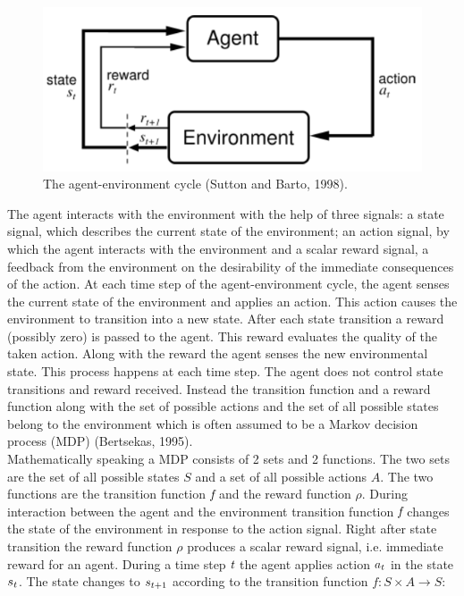 \begin{figure}[ht]
\vskip 0.2in
\centering
\includegraphics[scale=0.9]{agent-env-cycle.png}
\caption{The agent-environment cycle (Sutton and Barto, 1998).}
\vskip -0.2in
\label{fig:agent-env-cycle}
\end{figure}

The agent interacts with the environment with the help of three signals: a state signal, which describes the current state of the environment; an action signal, by which the agent interacts with the environment and a scalar reward signal, a feedback from the environment on the desirability of the immediate consequences of the action. At each time step of the agent-environment cycle, the agent senses the current state of the environment and applies an action. This action causes the environment to transition into a new state. After each state transition a reward (possibly zero) is passed to the agent. This reward evaluates the quality of the taken action. Along with the reward the agent senses the new environmental state. This process happens at each time step. The agent does not control state transitions and reward received. Instead the transition function and a reward function along with the set of possible actions and the set of all possible states belong to the environment which is often assumed to be a Markov decision process (MDP) (Bertsekas, 1995\nocite{bertsekas1995dynamic}). \\

Mathematically speaking a MDP consists of 2 sets and 2 functions. The two sets are the set of all possible states $\textit{S}$ and a set of all possible actions $\textit{A}$. The two functions are the transition function $\emph{f}$ and the reward function $\rho$. During interaction between the agent and the environment transition function $\emph{f}$ changes the state of the environment in response to the action signal. Right after state transition the reward function $\rho$ produces a scalar reward signal, i.e. immediate reward for an agent. During a time step $\emph{t}$ the agent applies action $\emph{$a_{t}$}$ in the state $\emph{$s_{t}$}$. The state changes to $\emph{$s_{t+1}$}$ according to the transition function $ f : S \times A \rightarrow S $:

